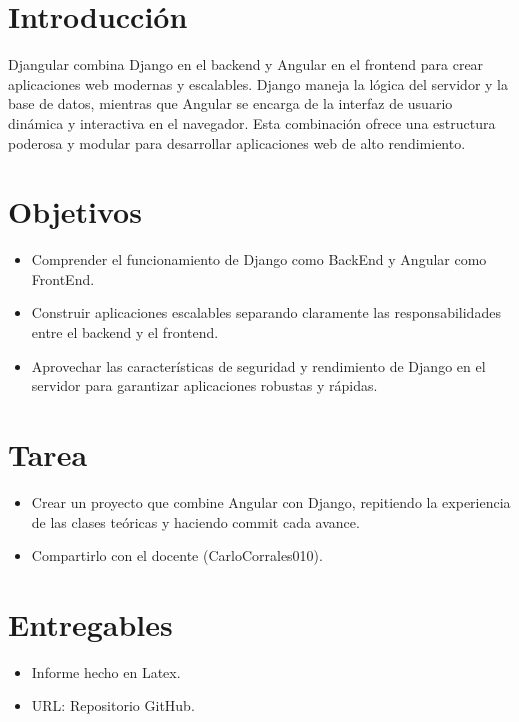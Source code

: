 \documentclass{article}
\begin{document}
  \section{Introducción}
  Djangular combina Django en el backend y Angular en el frontend para crear aplicaciones web modernas 
  y escalables. Django maneja la lógica del servidor y la base de datos, mientras que Angular se encarga 
  de la interfaz de usuario dinámica y interactiva en el navegador. Esta combinación ofrece una estructura 
  poderosa y modular para desarrollar aplicaciones web de alto rendimiento.


  \section{Objetivos}
  \begin{itemize}
    \item Comprender el funcionamiento de Django como BackEnd y Angular como FrontEnd.
    \item Construir aplicaciones escalables separando claramente las responsabilidades entre el backend y el frontend.
    \item Aprovechar las características de seguridad y rendimiento de Django en el servidor para garantizar aplicaciones
    robustas y rápidas.
  \end{itemize}

 
	\section{Tarea}
  \begin{itemize}
    \item Crear un proyecto que combine Angular con Django, repitiendo la experiencia de las clases teóricas y haciendo commit cada avance.  
    \item Compartirlo con el docente (CarloCorrales010).
  \end{itemize}
 
 
  \section{Entregables}
  \begin{itemize}
    \item Informe hecho en Latex.
    \item URL: Repositorio GitHub.
  \end{itemize}
  
\end{document}
